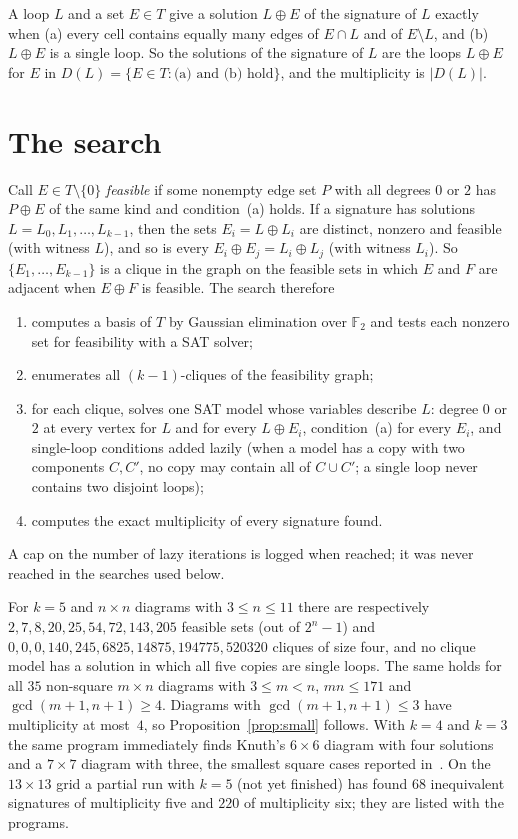 \documentclass[11pt]{amsart}
\theoremstyle{remark}
\begin{document}
A loop $L$ and a set $E\in T$ give a solution $L\oplus E$ of the signature of $L$ exactly when (a) every cell
contains equally many edges of $E\cap L$ and of $E\setminus L$, and (b) $L\oplus E$ is a single loop. So the solutions
of the signature of $L$ are the loops $L\oplus E$ for $E$ in
$D(L)=\{E\in T: \text{(a) and (b) hold}\}$, and the multiplicity is $|D(L)|$.

\section{The search}
Call $E\in T\setminus\{0\}$ \emph{feasible} if some nonempty edge set $P$ with all degrees $0$ or $2$ has
$P\oplus E$ of the same kind and condition~(a) holds. If a signature has solutions $L=L_0,L_1,\dots,L_{k-1}$, then
the sets $E_i=L\oplus L_i$ are distinct, nonzero and feasible (with witness $L$), and so is every
$E_i\oplus E_j=L_i\oplus L_j$ (with witness $L_i$). So $\{E_1,\dots,E_{k-1}\}$ is a clique in the graph on the feasible
sets in which $E$ and $F$ are adjacent when $E\oplus F$ is feasible. The search therefore
\begin{enumerate}
\item computes a basis of $T$ by Gaussian elimination over $\mathbb F_2$ and tests each nonzero set for feasibility
with a SAT solver;
\item enumerates all $(k-1)$-cliques of the feasibility graph;
\item for each clique, solves one SAT model whose variables describe $L$: degree $0$ or $2$ at every vertex for $L$ and
for every $L\oplus E_i$, condition~(a) for every $E_i$, and single-loop conditions added lazily (when a model has a copy
with two components $C,C'$, no copy may contain all of $C\cup C'$; a single loop never contains two disjoint loops);
\item computes the exact multiplicity of every signature found.
\end{enumerate}
A cap on the number of lazy iterations is logged when reached; it was never reached in the searches used below.

For $k=5$ and $n\times n$ diagrams with $3\le n\le11$ there are respectively $2,7,8,20,25,54,72,143,205$ feasible sets
(out of $2^n-1$) and $0,0,0,140,245,6825,14875,194775,520320$ cliques of size four, and no clique model has a solution
in which all five copies are single loops. The same holds for all $35$ non-square $m\times n$ diagrams with
$3\le m<n$, $mn\le171$ and $\gcd(m+1,n+1)\ge4$. Diagrams with $\gcd(m+1,n+1)\le3$ have multiplicity at most~$4$, so
Proposition~\ref{prop:small} follows. With $k=4$ and $k=3$ the same program immediately finds Knuth's $6\times6$
diagram with four solutions and a $7\times7$ diagram with three, the smallest square cases reported
in~\cite{beluhov}. On the $13\times13$ grid a partial run with $k=5$ (not yet finished) has found $68$ inequivalent signatures
of multiplicity five and $220$ of multiplicity six; they are listed with the programs.
\end{document}
